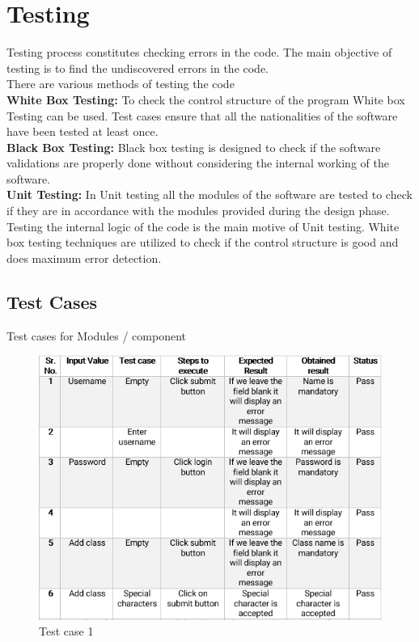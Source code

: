 \newpage

\section{Testing}
\vspace{-0.5cm}
Testing process constitutes checking errors in the code. The main objective of testing is to find the undiscovered errors in the code.\\
There are various methods of testing the code \\
\textbf{White Box Testing:}
To check the control structure of the program White box Testing can be used.
Test cases ensure that all the nationalities of the software have been tested at least once.\\
\textbf{Black Box Testing:}
Black box testing is designed to check if the software validations are properly done without considering the internal working of the software.\\
\textbf{Unit Testing:}
In Unit testing all the modules of the software are tested to check if they are in accordance with the modules provided during the design phase. Testing the internal logic of the code is the main motive of Unit testing. White box testing techniques are utilized to check if the control structure is good and does maximum error detection.

\subsection{Test Cases}
Test cases for Modules / component \\
\begin{figure}[H]
\centering
\hfill\includegraphics[scale=0.9]{project/images/test1}\hspace*{\fill}
\caption{Test case 1}
\end{figure}

